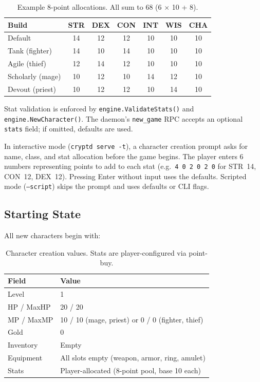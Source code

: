 \documentclass[a4paper,10pt]{article}
\newcommand{\stat}[1]{\textsc{#1}}
\newcommand{\cmd}[1]{\texttt{#1}}
\begin{document}
\begin{table}[h]
\centering
\begin{tabular}{@{}lcccccc@{}}
\toprule
\textbf{Build} & \stat{STR} & \stat{DEX} & \stat{CON} & \stat{INT} & \stat{WIS} & \stat{CHA} \\
\midrule
Default          & 14 & 12 & 12 & 10 & 10 & 10 \\
Tank (fighter)   & 14 & 10 & 14 & 10 & 10 & 10 \\
Agile (thief)    & 12 & 14 & 12 & 10 & 10 & 10 \\
Scholarly (mage) & 10 & 12 & 10 & 14 & 12 & 10 \\
Devout (priest)  & 10 & 12 & 12 & 10 & 14 & 10 \\
\bottomrule
\end{tabular}
\caption{Example 8-point allocations. All sum to 68 (6 $\times$ 10 + 8).}
\end{table}

Stat validation is enforced by \texttt{engine.ValidateStats()} and
\texttt{engine.NewCharacter()}. The daemon's \texttt{new\_game} RPC
accepts an optional \texttt{stats} field; if omitted, defaults are used.

In interactive mode (\cmd{cryptd serve -t}), a character creation prompt
asks for name, class, and stat allocation before the game begins. The
player enters 6 numbers representing points to add to each stat (e.g.\
\texttt{4 0 2 0 2 0} for STR~14, CON~12, DEX~12). Pressing Enter without
input uses the defaults. Scripted mode (\cmd{--script}) skips the prompt
and uses defaults or CLI flags.

\subsection{Starting State}

All new characters begin with:

\begin{table}[h]
\centering
\begin{tabular}{@{}ll@{}}
\toprule
\textbf{Field} & \textbf{Value} \\
\midrule
Level & 1 \\
HP / MaxHP & 20 / 20 \\
MP / MaxMP & 10 / 10 (mage, priest) or 0 / 0 (fighter, thief) \\
Gold & 0 \\
Inventory & Empty \\
Equipment & All slots empty (weapon, armor, ring, amulet) \\
Stats & Player-allocated (8-point pool, base 10 each) \\
\bottomrule
\end{tabular}
\caption{Character creation values. Stats are player-configured via point-buy.}
\end{table}
\end{document}
